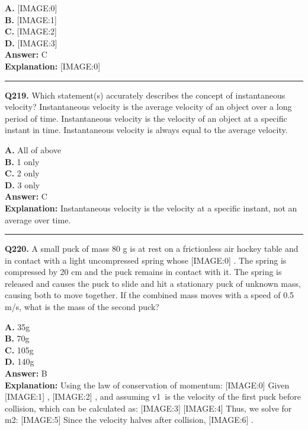 \documentclass[12pt]{article}
\begin{document}
\textbf{A.} [IMAGE:0] \\
\textbf{B.} [IMAGE:1] \\
\textbf{C.} [IMAGE:2] \\
\textbf{D.} [IMAGE:3] \\

\textbf{Answer:} C \\
\textbf{Explanation:} [IMAGE:0]

\hrule
\vspace{1em}


\noindent
\textbf{Q219.} Which statement(s) accurately describes the concept of instantaneous velocity?
Instantaneous velocity is the average velocity of an object over a long period of time.
Instantaneous velocity is the velocity of an object at a specific instant in time.
Instantaneous velocity is always equal to the average velocity.



\textbf{A.} All of above \\
\textbf{B.} 1 only \\
\textbf{C.} 2 only \\
\textbf{D.} 3 only \\

\textbf{Answer:} C \\
\textbf{Explanation:} Instantaneous velocity is the velocity at a specific instant, not an average over time.

\hrule
\vspace{1em}


\noindent
\textbf{Q220.} A small puck of mass 80 g is at rest on a frictionless air hockey table and in contact with a light uncompressed spring whose
[IMAGE:0]
. The spring is compressed by 20 cm and the puck remains in contact with it. The spring is released and causes the puck to slide and hit a stationary puck of unknown mass, causing both to move together. If the combined mass moves with a speed of 0.5 m/s, what is the mass of the second puck?



\textbf{A.} 35g \\
\textbf{B.} 70g \\
\textbf{C.} 105g \\
\textbf{D.} 140g \\

\textbf{Answer:} B \\
\textbf{Explanation:} Using the law of conservation of momentum:
[IMAGE:0]
Given
[IMAGE:1]
,
[IMAGE:2]
, and assuming v1 is the velocity of the first puck before collision, which can be calculated as:
[IMAGE:3]
[IMAGE:4]
Thus, we solve for m2:
[IMAGE:5]
Since the velocity halves after collision,
[IMAGE:6]
.
\end{document}
